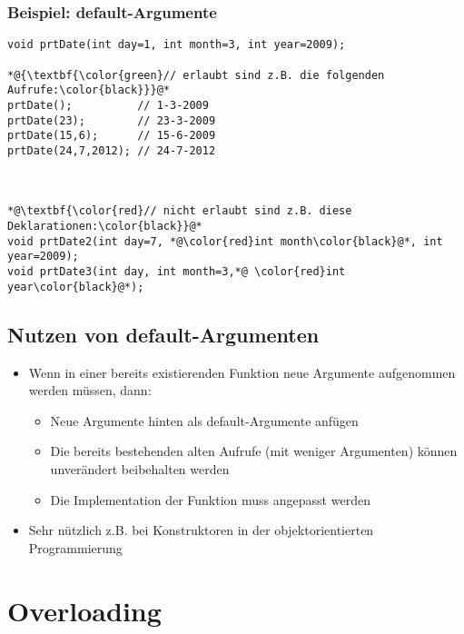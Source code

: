 \subsubsection{Beispiel: default-Argumente}
\label{sec:Beispiel: default-Argumente}
\noindent
\begin{minipage}{\linewidth}
\begin{lstlisting}
void prtDate(int day=1, int month=3, int year=2009);
	
*@{\textbf{\color{green}// erlaubt sind z.B. die folgenden Aufrufe:\color{black}}}@*
prtDate();			// 1-3-2009
prtDate(23);		// 23-3-2009
prtDate(15,6);		// 15-6-2009
prtDate(24,7,2012);	// 24-7-2012

	

*@\textbf{\color{red}// nicht erlaubt sind z.B. diese Deklarationen:\color{black}}@*
void prtDate2(int day=7, *@\color{red}int month\color{black}@*, int year=2009);
void prtDate3(int day, int month=3,*@ \color{red}int year\color{black}@*);
\end{lstlisting}
\end{minipage}

\subsection{Nutzen von default-Argumenten}
\label{sec:Nutzen von default-Argumenten}
\begin{itemize}
	\item Wenn in einer bereits existierenden Funktion neue Argumente aufgenommen werden müssen, dann:
	\begin{itemize}
		\item Neue Argumente hinten als default-Argumente anfügen
		\item Die bereits bestehenden alten Aufrufe (mit weniger Argumenten) können unverändert beibehalten werden
		\item Die Implementation der Funktion muss angepasst werden
	\end{itemize}
	\item Sehr nützlich z.B. bei Konstruktoren in der objektorientierten Programmierung
\end{itemize}


\section{Overloading}
\label{sec:Overloading}

